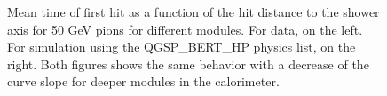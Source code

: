 \documentclass{JINST}
\newcommand\ddhep{\textsc{DD4hep}\xspace}
\begin{document}
\begin{figure}[htbp!]
\begin{subfigure}[t]{0.49\textwidth}
    \caption{} \label{fig:Radius_Individual_Sim_50GeV}
  \end{subfigure}
  \caption{Mean time of first hit as a function of the hit distance to the shower axis for 50 GeV pions for different modules. For data, on the left. For simulation using the QGSP\_BERT\_HP physics list, on the right. Both figures shows the same behavior with a decrease of the curve slope for deeper modules in the calorimeter.}
  \label{fig:Radius_SimData_50GeVComparison_Individual}
\end{figure}

%
%
%
\end{document}
